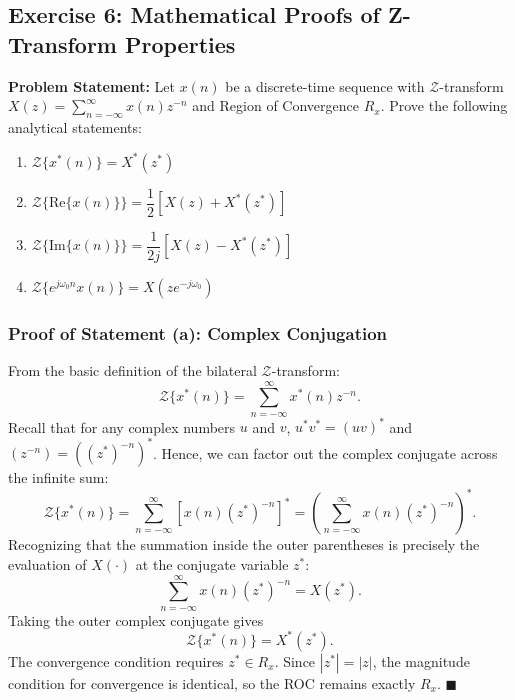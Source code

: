 \documentclass[12pt,a4paper]{article}
\begin{document}
\subsection{Exercise 6: Mathematical Proofs of Z-Transform Properties}
\textbf{Problem Statement:} Let $x(n)$ be a discrete-time sequence with $\mathcal{Z}$-transform $X(z) = \sum_{n=-\infty}^{\infty} x(n) z^{-n}$ and Region of Convergence $R_x$. Prove the following analytical statements:
\begin{enumerate}[label=(\alph*)]
    \item $\mathcal{Z}\{x^*(n)\} = X^*(z^*)$
    \item $\mathcal{Z}\{\text{Re}\{x(n)\}\} = \dfrac{1}{2}\left[ X(z) + X^*(z^*) \right]$
    \item $\mathcal{Z}\{\text{Im}\{x(n)\}\} = \dfrac{1}{2j}\left[ X(z) - X^*(z^*) \right]$
    \item $\mathcal{Z}\{e^{j\omega_0 n} x(n)\} = X(z e^{-j\omega_0})$
\end{enumerate}

\subsubsection{Proof of Statement (a): Complex Conjugation}
From the basic definition of the bilateral $\mathcal{Z}$-transform:
\begin{equation}
    \mathcal{Z}\{x^*(n)\} = \sum_{n=-\infty}^{\infty} x^*(n) z^{-n}.
\end{equation}
Recall that for any complex numbers $u$ and $v$, $u^* v^* = (u v)^*$ and $(z^{-n}) = ((z^*)^{-n})^*$. Hence, we can factor out the complex conjugate across the infinite sum:
\begin{equation}
    \mathcal{Z}\{x^*(n)\} = \sum_{n=-\infty}^{\infty} \left[ x(n) (z^*)^{-n} \right]^* = \left( \sum_{n=-\infty}^{\infty} x(n) (z^*)^{-n} \right)^*.
\end{equation}
Recognizing that the summation inside the outer parentheses is precisely the evaluation of $X(\cdot)$ at the conjugate variable $z^*$:
\begin{equation}
    \sum_{n=-\infty}^{\infty} x(n) (z^*)^{-n} = X(z^*).
\end{equation}
Taking the outer complex conjugate gives
\begin{equation}
    \mathcal{Z}\{x^*(n)\} = X^*(z^*).
\end{equation}
The convergence condition requires $z^* \in R_x$. Since $|z^*| = |z|$, the magnitude condition for convergence is identical, so the ROC remains exactly $R_x$. \hfill $\blacksquare$
\end{document}
